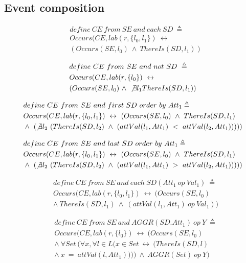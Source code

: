\subsection{Event composition}
\begin{align*}%
&define\ CE\ from\ SE\ and\ each\ SD\ \triangleq\\
&Occurs(CE, lab(r, \{l_0, l_1\})\ \leftrightarrow\\
&(Occurs(SE, l_0)\ \wedge\ ThereIs(SD, l_1))
\end{align*}

\begin{align*}%
&define\ CE\ from\ SE\ and\ not\ SD\ \triangleq\\
&Occurs(CE, lab(r, \{l_0\})\ \leftrightarrow\\
&(Occurs(SE, l_0)\ \wedge\ \not \exists l_1 ThereIs(SD, l_1))
\end{align*}

\begin{align*}%
&define\ CE\ from\ SE\ and\ first\ SD\ order\ by\ Att_1\triangleq\\
&Occurs(CE, lab(r, \{l_0, l_1\})\ \leftrightarrow\ (Occurs(SE, l_0)\ \wedge\ ThereIs(SD, l_1)\\
&\wedge\ (\not \exists l_2\ (ThereIs(SD, l_2)\ \wedge\ (attVal(l_1, Att_1)\ <\ attVal(l_2, Att_1)))))
\end{align*}

\begin{align*}%
&define\ CE\ from\ SE\ and\ last\ SD\ order\ by\ Att_1\triangleq\\
&Occurs(CE, lab(r, \{l_0, l_1\})\ \leftrightarrow\ (Occurs(SE, l_0)\ \wedge\ ThereIs(SD, l_1)\\
&\wedge\ (\not \exists l_2\ (ThereIs(SD, l_2)\ \wedge\ (attVal(l_1, Att_1)\ >\ attVal(l_2, Att_1)))))
\end{align*}

\begin{align*}%
&define\ CE\ from\ SE\ and\ each\ SD(Att_1\ op \ Val_1)\ \triangleq\\
&Occurs(CE, lab(r, \{l_0, l_1\})\ \leftrightarrow\ (Occurs(SE, l_0)\\
&\wedge\ ThereIs(SD, l_1)\ \wedge\ (attVal(l_1, Att_1)\ op\ Val_1))
\end{align*}

\begin{align*}%
&define\ CE\ from\ SE\ and\ AGGR(SD.Att_1)\ op\ Y\ \triangleq\\
&Occurs(CE, lab(r, \{l_0\})\ \leftrightarrow\ (Occurs(SE, l_0)\\
&\wedge\ \forall Set\ (\forall x, \forall l \in L
(x \in Set\ \leftrightarrow\ (ThereIs(SD, l)\\
&\wedge\ x\ =\ attVal(l, Att_1))))\ \wedge\ AGGR(Set)\ op\ Y)
\end{align*}

